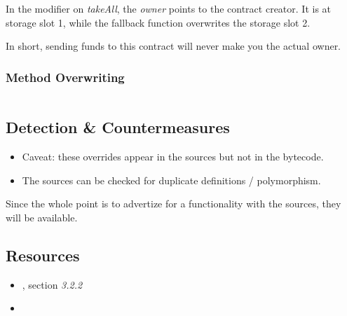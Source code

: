 In the modifier on \emph{takeAll}, the \emph{owner} points to the contract creator.
It is at storage slot 1, while the fallback function overwrites the storage slot 2.

In short, sending funds to this contract will never make you the actual owner.

\subsubsection{Method Overwriting}

\begin{lstlisting}

\end{lstlisting}

\subsection{Detection \& Countermeasures}

\begin{itemize}
\item{Caveat: these overrides appear in the sources but not in the bytecode.}
\item{The sources can be checked for duplicate definitions / polymorphism.}
\end{itemize}

Since the whole point is to advertize for a functionality with the sources, they will be available.

\subsection{Resources}

\begin{itemize}
\item{\cite{paper-art-of-the-scam}, section \emph{3.2.2}}
\item{\cite{video-masquerading-code}}
\end{itemize}
